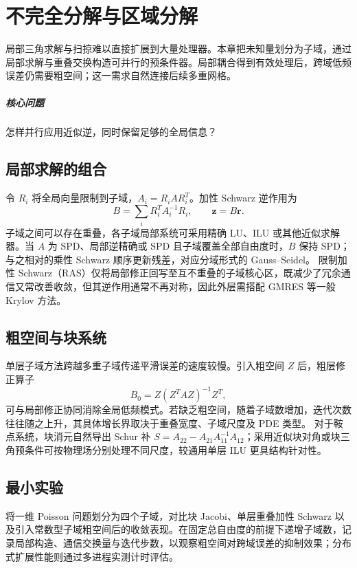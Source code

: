\chapter{不完全分解与区域分解}\label{v0ch:18}
\begin{chaptersummary}
局部三角求解与扫掠难以直接扩展到大量处理器。本章把未知量划分为子域，通过局部求解与重叠交换构造可并行的预条件器。局部耦合得到有效处理后，跨域低频误差仍需要粗空间；这一需求自然连接后续多重网格。
\end{chaptersummary}
\paragraph{核心问题}怎样并行应用近似逆，同时保留足够的全局信息？

\section{局部求解的组合}
令 $R_i$ 将全局向量限制到子域，$A_i=R_iAR_i^T$。加性 Schwarz 逆作用为
\[
 B=\sum_i R_i^TA_i^{-1}R_i,\qquad \bm z=B\bm r.
\]
子域之间可以存在重叠，各子域局部系统可采用精确 LU、ILU 或其他近似求解器。当 $A$ 为 SPD、局部逆精确或 SPD 且子域覆盖全部自由度时，$B$ 保持 SPD；与之相对的乘性 Schwarz 顺序更新残差，对应分域形式的 Gauss--Seidel。
限制加性 Schwarz（RAS）仅将局部修正回写至互不重叠的子域核心区，既减少了冗余通信又常改善收敛，但其逆作用通常不再对称，因此外层需搭配 GMRES 等一般 Krylov 方法。
\section{粗空间与块系统}
单层子域方法跨越多重子域传递平滑误差的速度较慢。引入粗空间 $Z$ 后，粗层修正算子
\[
 B_0=Z(Z^TAZ)^{-1}Z^T,
\]
可与局部修正协同消除全局低频模式。若缺乏粗空间，随着子域数增加，迭代次数往往随之上升，其具体增长界取决于重叠宽度、子域尺度及 PDE 类型。
对于鞍点系统，块消元自然导出 Schur 补 $S=A_{22}-A_{21}A_{11}^{-1}A_{12}$；采用近似块对角或块三角预条件可按物理场分别处理不同尺度，较通用单层 ILU 更具结构针对性。
\section{最小实验}
将一维 Poisson 问题划分为四个子域，对比块 Jacobi、单层重叠加性 Schwarz 以及引入常数型子域粗空间后的收敛表现。在固定总自由度的前提下递增子域数，记录局部构造、通信交换量与迭代步数，以观察粗空间对跨域误差的抑制效果；分布式扩展性能则通过多进程实测计时评估。
